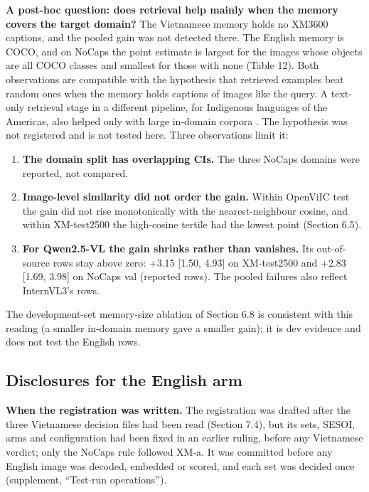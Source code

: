 \documentclass[manuscript,screen]{acmart}
\providecommand{\tightlist}{\setlength{\itemsep}{0pt}\setlength{\parskip}{0pt}}
\begin{document}
\textbf{A post-hoc question: does retrieval help mainly when the memory covers the target domain?}
The Vietnamese memory holds no XM3600 captions, and the pooled gain was not detected there. The
English memory is COCO, and on NoCaps the point estimate is largest for the images whose objects are
all COCO classes and smallest for those with none (Table 12). Both observations are compatible with
the hypothesis that retrieved examples beat random ones when the memory holds captions of images
like the query. A text-only retrieval stage in a different pipeline, for Indigenous languages of the
Americas, also helped only with large in-domain corpora \citep{Dhawan2026Gators}. The hypothesis was
not registered and is not tested here. Three observations limit it:

\begin{enumerate}
\def\labelenumi{\arabic{enumi}.}
\tightlist
\item
  \textbf{The domain split has overlapping CIs.} The three NoCaps domains were reported, not
  compared.
\item
  \textbf{Image-level similarity did not order the gain.} Within OpenViIC test the gain did not rise
  monotonically with the nearest-neighbour cosine, and within XM-test2500 the high-cosine tertile
  had the lowest point (Section 6.5).
\item
  \textbf{For Qwen2.5-VL the gain shrinks rather than vanishes.} Its out-of-source rows stay above
  zero: +3.15 {[}1.50, 4.93{]} on XM-test2500 and +2.83 {[}1.69, 3.98{]} on NoCaps val (reported
  rows). The pooled failures also reflect InternVL3's rows.
\end{enumerate}

The development-set memory-size ablation of Section 6.8 is consistent with this reading (a smaller
in-domain memory gave a smaller gain); it is dev evidence and does not test the English rows.

\subsection{Disclosures for the English arm}\label{disclosures-for-the-english-arm}

\textbf{When the registration was written.} The registration was drafted after the three Vietnamese
decision files had been read (Section 7.4), but its sets, SESOI, arms and configuration had been
fixed in an earlier ruling, before any Vietnamese verdict; only the NoCaps rule followed XM-a. It
was committed before any English image was decoded, embedded or scored, and each set was decided
once (supplement, ``Test-run operations'').
\end{document}
